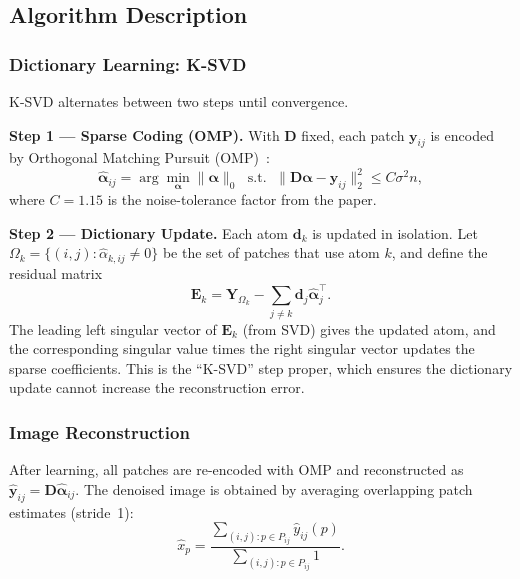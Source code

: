 \subsection{Algorithm Description}

\subsubsection{Dictionary Learning: K-SVD}

K-SVD alternates between two steps until convergence.

\textbf{Step 1 — Sparse Coding (OMP).}
With $\mathbf{D}$ fixed, each patch $\mathbf{y}_{ij}$ is encoded
by Orthogonal Matching Pursuit (OMP)~\cite{pati1993orthogonal}:
\begin{equation}
    \hat{\boldsymbol{\alpha}}_{ij} = \arg\min_{\boldsymbol{\alpha}}
    \|\boldsymbol{\alpha}\|_0 \;\text{ s.t. }\;
    \|\mathbf{D}\boldsymbol{\alpha} - \mathbf{y}_{ij}\|_2^2
    \leq C\sigma^2 n,
    \label{eq:omp}
\end{equation}
where $C = 1.15$ is the noise-tolerance factor from the paper.

\textbf{Step 2 — Dictionary Update.}
Each atom $\mathbf{d}_k$ is updated in isolation.  Let
$\Omega_k = \{(i,j) : \hat{\alpha}_{k,ij} \neq 0\}$ be the set of
patches that use atom $k$, and define the residual matrix
\begin{equation}
    \mathbf{E}_k = \mathbf{Y}_{\Omega_k}
    - \sum_{j \neq k} \mathbf{d}_j \hat{\boldsymbol{\alpha}}_j^{\top}.
\end{equation}
The leading left singular vector of $\mathbf{E}_k$ (from SVD)
gives the updated atom, and the corresponding singular value times
the right singular vector updates the sparse coefficients.  This is
the ``K-SVD'' step proper, which ensures the dictionary update
cannot increase the reconstruction error.

\subsubsection{Image Reconstruction}

After learning, all patches are re-encoded with OMP and
reconstructed as $\hat{\mathbf{y}}_{ij} = \mathbf{D}
\hat{\boldsymbol{\alpha}}_{ij}$.  The denoised image is obtained by
averaging overlapping patch estimates (stride~1):
\begin{equation}
    \hat{x}_p = \frac{\displaystyle\sum_{(i,j):p\in P_{ij}}
                      \hat{y}_{ij}(p)}
                     {\displaystyle\sum_{(i,j):p\in P_{ij}} 1}.
    \label{eq:avg}
\end{equation}

